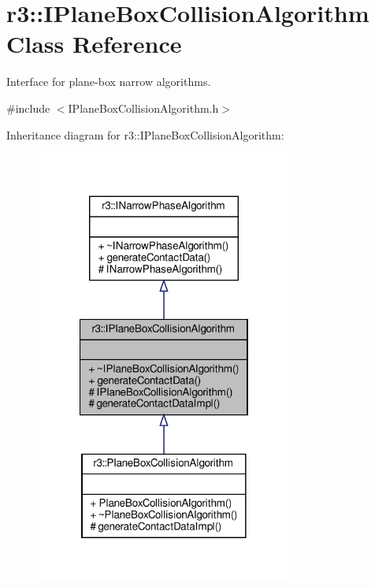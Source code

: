 \hypertarget{classr3_1_1_i_plane_box_collision_algorithm}{}\section{r3\+:\+:I\+Plane\+Box\+Collision\+Algorithm Class Reference}
\label{classr3_1_1_i_plane_box_collision_algorithm}


Interface for plane-\/box narrow algorithms.  




{\ttfamily \#include $<$I\+Plane\+Box\+Collision\+Algorithm.\+h$>$}



Inheritance diagram for r3\+:\+:I\+Plane\+Box\+Collision\+Algorithm\+:\nopagebreak
\begin{figure}[H]
\begin{center}
\leavevmode
\includegraphics[width=240pt]{classr3_1_1_i_plane_box_collision_algorithm__inherit__graph}
\end{center}
\end{figure}


